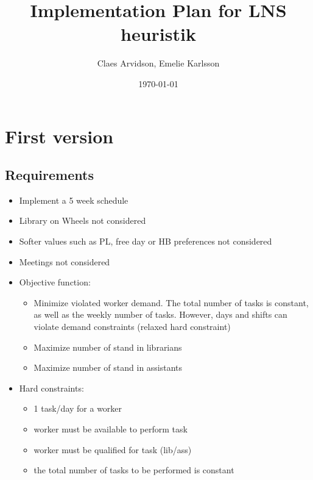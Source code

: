 \documentclass{article}
\title{Implementation Plan for LNS heuristik}
\author{Claes Arvidson, Emelie Karlsson}
\date{\today}
\begin{document}
 
\maketitle
 
\section*{First version }
	\subsection*{Requirements}
	\begin{itemize}
	\item Implement a 5 week schedule
	\item Library on Wheels not considered
	\item Softer values such as PL, free day or HB preferences not considered
	\item Meetings not considered
	\item Objective function:
		\begin{itemize}
		\item Minimize violated worker demand. The total number of tasks is constant, as well as the weekly number of tasks. However, days and shifts can violate demand constraints (relaxed hard constraint)
		\item Maximize number of stand in librarians
		\item Maximize number of stand in assistants
		\end{itemize}
	\item Hard constraints:
		\begin{itemize}
		\item 1 task/day for a worker
		\item worker must be available to perform task
		\item worker must be qualified for task (lib/ass)
		\item the total number of tasks to be performed is constant
		\end{itemize} 
	\end{itemize}
\end{document}
